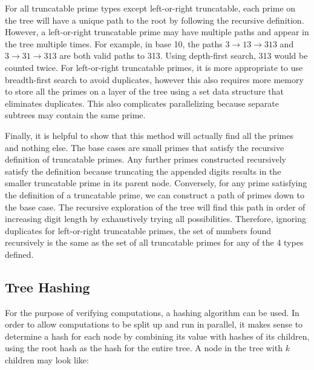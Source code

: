 \documentclass[12pt]{article}
\begin{document}
For all truncatable prime types except left-or-right truncatable, each prime on the tree will have a unique path to the root by following the recursive definition. However, a left-or-right truncatable prime may have multiple paths and appear in the tree multiple times. For example, in base 10, the paths $3\to13\to313$ and $3\to31\to313$ are both valid paths to 313. Using depth-first search, 313 would be counted twice. For left-or-right truncatable primes, it is more appropriate to use breadth-first search to avoid duplicates, however this also requires more memory to store all the primes on a layer of the tree using a set data structure that eliminates duplicates. This also complicates parallelizing because separate subtrees may contain the same prime.

Finally, it is helpful to show that this method will actually find all the primes and nothing else. The base cases are small primes that satisfy the recursive definition of truncatable primes. Any further primes constructed recursively satisfy the definition because truncating the appended digits results in the smaller truncatable prime in its parent node. Conversely, for any prime satisfying the definition of a truncatable prime, we can construct a path of primes down to the base case. The recursive exploration of the tree will find this path in order of increasing digit length by exhaustively trying all possibilities. Therefore, ignoring duplicates for left-or-right truncatable primes, the set of numbers found recursively is the same as the set of all truncatable primes for any of the 4 types defined.

\subsection{Tree Hashing}

For the purpose of verifying computations, a hashing algorithm can be used. In order to allow computations to be split up and run in parallel, it makes sense to determine a hash for each node by combining its value with hashes of its children, using the root hash as the hash for the entire tree. A node in the tree with $k$ children may look like:

\begin{center}
\end{center}
\end{document}
